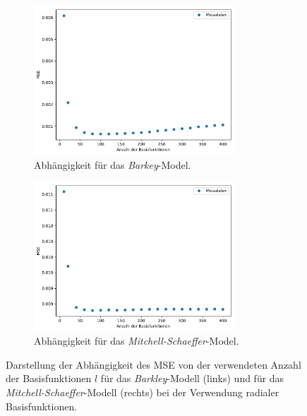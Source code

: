 \begin{figure}[h]
	\centering
	\begin{subfigure}{.5\textwidth}
		\centering
		\includegraphics[height=2.2in]{figures/results/cross_prediction/rbf_placements_uv_mse.pdf}
		\setcapmargin[1cm]{1cm}
		\caption{Abhängigkeit für das \textit{Barkey}-Model.}
		\label{fig:exp_cross_rbf_placements_mse_uv}
	\end{subfigure}%
	\begin{subfigure}{.5\textwidth}
		\centering
		\includegraphics[height=2.2in]{figures/results/cross_prediction/rbf_placements_vh_mse.pdf}
		\setcapmargin[1cm]{1cm}
  		\caption{Abhängigkeit für das \textit{Mitchell-Schaeffer}-Model.}
  		\label{fig:exp_cross_rbf_placements_mse_vh}
	\end{subfigure}
	\caption{Darstellung der Abhängigkeit des MSE von der verwendeten Anzahl der Basisfunktionen $l$ für das \textit{Barkley}-Modell (links) und für das \textit{Mitchell-Schaeffer}-Modell (rechts) bei der Verwendung radialer Basisfunktionen.}
	\label{fig:exp_cross_rbf_placements_mse}
\end{figure}

\FloatBarrier
